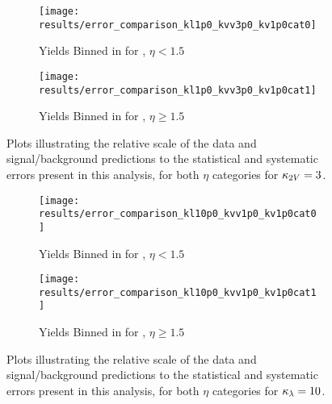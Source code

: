     \begin{figure}
        \centering
        \begin{subfigure}{0.48\textwidth} 
            \texttt{[image: results/error\_comparison\_kl1p0\_kvv3p0\_kv1p0cat0]}
            \caption{Yields Binned in \mhh for , $\eta < 1.5$}
            \label{fig:error_dump_eta0_3p00_1p00_1p00}
        \end{subfigure}
        \begin{subfigure}{0.48\textwidth}
            \texttt{[image: results/error\_comparison\_kl1p0\_kvv3p0\_kv1p0cat1]}
            \caption{Yields Binned in \deta for , $\eta \geq 1.5$}
            \label{fig:error_dump_eta1_hh_3p00_1p00_1p00}
        \end{subfigure}
        \caption{
            Plots illustrating the relative scale of the data and signal/background predictions
                to the statistical and systematic errors present in this analysis,
                for both $\eta$ categories for $\kappa_{2V}=3$.
        }
        \label{fig:error_dump_kvv3}
    \end{figure}

    \begin{figure}
        \centering
        \begin{subfigure}{0.48\textwidth} 
            \texttt{[image: results/error\_comparison\_kl10p0\_kvv1p0\_kv1p0cat0]}
            \caption{Yields Binned in \mhh for , $\eta < 1.5$}
            \label{fig:error_dump_eta0_1p00_10p00_1p00}
        \end{subfigure}
        \begin{subfigure}{0.48\textwidth}
            \texttt{[image: results/error\_comparison\_kl10p0\_kvv1p0\_kv1p0cat1]}
            \caption{Yields Binned in \deta for , $\eta \geq 1.5$}
            \label{fig:error_dump_eta1_hh_1p00_10p00_1p00}
        \end{subfigure}
        \caption{
            Plots illustrating the relative scale of the data and signal/background predictions
                to the statistical and systematic errors present in this analysis,
                for both $\eta$ categories for $\kappa_{\lambda}=10$.
        }
        \label{fig:error_dump_kl10}
    \end{figure}


